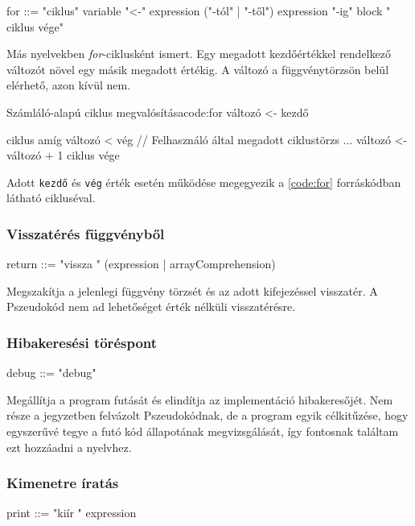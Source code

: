 \begin{ebnf}
for ::= "ciklus" variable "<-" expression ("-tól" | "-től") expression "-ig" block " ciklus vége"
\end{ebnf}

Más nyelvekben \textit{for}-ciklusként ismert. Egy megadott kezdőértékkel rendelkező változót növel egy másik megadott értékig. A változó a függvénytörzsön belül elérhető, azon kívül nem.

\begin{code}{Számláló-alapú ciklus megvalósítása}{code:for}
változó <- kezdő

ciklus amíg változó < vég
    // Felhasználó által megadott ciklustörzs ...
    változó <- változó + 1
ciklus vége
\end{code}

Adott \texttt{kezdő} és \texttt{vég} érték esetén működése megegyezik a \ref{code:for} forráskódban látható cikluséval.

\subsubsection{Visszatérés függvényből}

\begin{ebnf}
return ::= "vissza " (expression | arrayComprehension) 
\end{ebnf}

Megszakítja a jelenlegi függvény törzsét és az adott kifejezéssel visszatér. A Pszeudokód nem ad lehetőséget érték nélküli visszatérésre.

\subsubsection{Hibakeresési töréspont}

\begin{ebnf}
debug ::= "debug"
\end{ebnf}

Megállítja a program futását és elindítja az implementáció hibakeresőjét. Nem része a jegyzetben felvázolt Pszeudokódnak, de a program egyik célkitűzése, hogy egyszerűvé tegye a futó kód állapotának megvizsgálását, így fontosnak találtam ezt hozzáadni a nyelvhez.

\subsubsection{Kimenetre íratás}

\begin{ebnf}
print ::= "kiír " expression
\end{ebnf}

